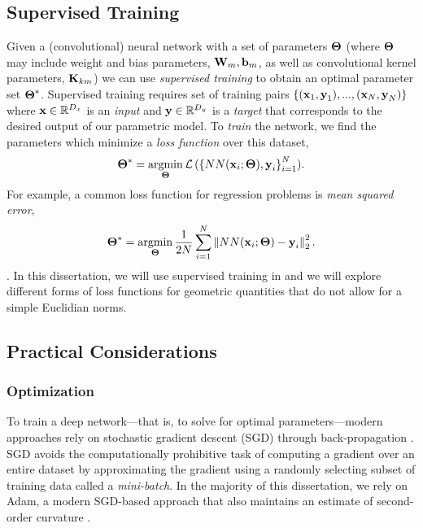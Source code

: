 \subsection{Supervised Training}
Given a (convolutional) neural network with a set of parameters $\boldsymbol{\mathbf{\Theta}}$ (where $\boldsymbol{\mathbf{\Theta}}$ may include weight and bias parameters, $\boldsymbol{\mathbf{W}}_m, \boldsymbol{\mathbf{b}}_m$, as well as convolutional kernel parameters, $\boldsymbol{\mathbf{K}}_{km}$) we can use \textit{supervised training} to obtain an optimal parameter set $\boldsymbol{\mathbf{\Theta}}^*$. Supervised training requires  set of training pairs $\{(\boldsymbol{\mathbf{x}}_1, \boldsymbol{\mathbf{y}}_1),...,(\boldsymbol{\mathbf{x}}_N, \boldsymbol{\mathbf{y}}_N) \}$ where $\boldsymbol{\mathbf{x}} \in \mathbb{R}^{D_x}$ is an \textit{input} and $\boldsymbol{\mathbf{y}} \in \mathbb{R}^{D_y}$ is a \textit{target} that corresponds to the desired output of our parametric model. To \textit{train} the network, we find the parameters which minimize a \textit{loss function} over this dataset,
\begin{equation}
\label{eq:math_nn_loss}
 \boldsymbol{\mathbf{\Theta}}^* = \operatorname*{argmin}_{\boldsymbol{\mathbf{\Theta}}} \mathcal{L}\left(\{NN(\boldsymbol{\mathbf{x}}_i; \boldsymbol{\mathbf{\Theta}}), \boldsymbol{\mathbf{y}}_i\right\}_{i=1}^N).
\end{equation}
For example, a common loss function for regression problems is \textit{mean squared error},
\begin{equation}
\boldsymbol{\mathbf{\Theta}}^* = \operatorname*{argmin}_{\boldsymbol{\mathbf{\Theta}}} \frac{1}{2N}\sum_{i=1}^N\left\Vert NN(\boldsymbol{\mathbf{x}}_i; \boldsymbol{\mathbf{\Theta}}) - \boldsymbol{\mathbf{y}}_i\right\Vert_2^2.
\end{equation}.
In this dissertation, we will use supervised training in  and we will explore different forms of loss functions for geometric quantities that do not allow for a simple Euclidian norms. 
\subsection{Practical Considerations}

\subsubsection{Optimization}

To train a deep network---that is, to solve  for optimal parameters---modern approaches rely on stochastic gradient descent (SGD) through back-propagation \citep{LeCun2015-qf}. SGD avoids the computationally prohibitive task of computing a gradient over an entire dataset by approximating the gradient using a randomly selecting subset of training data called a \textit{mini-batch}. In the majority of this dissertation, we rely on Adam, a modern SGD-based approach that also maintains an estimate of second-order curvature \citep{kingma_adam_2017}.

